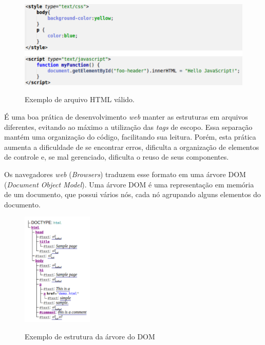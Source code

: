 \begin{figure}[!htb]
	\centering
	\caption{Exemplo de arquivo HTML válido.}
	\includegraphics[width=1\textwidth]{./04-figuras/style_script}
	\label{fig:styleScript}
\end{figure}

É uma boa prática de desenvolvimento \textit{web} manter as estruturas em arquivos diferentes, evitando ao máximo a utilização das \textit{tags} de escopo. Essa separação mantém uma organização do código, facilitando sua leitura. Porém, esta prática aumenta a dificuldade de se encontrar erros, dificulta a organização de elementos de controle e, se mal gerenciado, dificulta o reuso de seus componentes.

Os navegadores \textit{web} (\textit{Browsers}) traduzem esse formato em uma árvore DOM (\textit{Document Object Model}). Uma árvore DOM é uma representação em memória de um documento, que possui vários nós, cada nó agrupando alguns elementos do documento.

\begin{figure}[!htb]
	\centering
	\caption{Exemplo de estrutura da árvore do DOM}
	\includegraphics[width=0.3\textwidth]{./04-figuras/DOMsnippet}
	\label{fig:domtree}
\end{figure}

